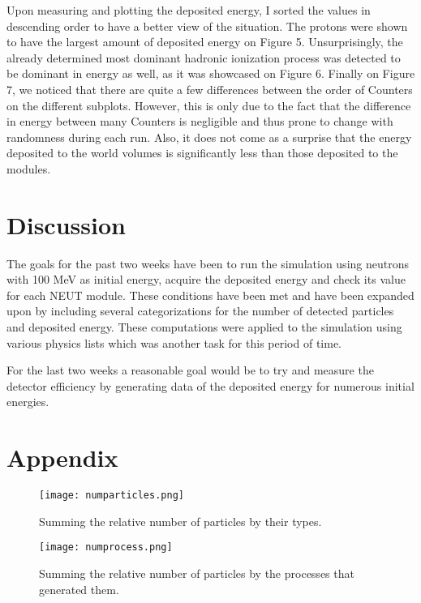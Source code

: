 \documentclass[12pt,twocolumn]{article}
\begin{document}
Upon measuring and plotting the deposited energy, I sorted the values in descending order to have a better view of the situation. The protons were shown to have the largest amount of deposited energy on Figure 5. Unsurprisingly, the already determined most dominant hadronic ionization process was detected to be dominant in energy as well, as it was showcased on Figure 6. Finally on Figure 7, we noticed that there are quite a few differences between the order of Counters on the different subplots. However, this is only due to the fact that the difference in energy between many Counters is negligible and thus prone to change with randomness during each run. Also, it does not come as a surprise that the energy deposited to the world volumes is significantly less than those deposited to the modules.

\section{Discussion}
The goals for the past two weeks have been to run the simulation using neutrons with 100 MeV as initial energy, acquire the deposited energy and check its value for each NEUT module. These conditions have been met and have been expanded upon by including several categorizations for the number of detected particles and deposited energy. These computations were applied to the simulation using various physics lists which was another task for this period of time.

For the last two weeks a reasonable goal would be to try and measure the detector efficiency by generating data of the deposited energy for numerous initial energies.







\onecolumn
\section*{Appendix}

\begin{figure}[H]
    \centering
    \texttt{[image: numparticles.png]}
    \caption{Summing the relative number of particles by their types.}
    \label{fig:my_label}
\end{figure}

\begin{figure}[H]
    \centering
    \texttt{[image: numprocess.png]}
    \caption{Summing the relative number of particles by the processes that generated them.}
    \label{fig:my_label}
\end{figure}
\end{document}
